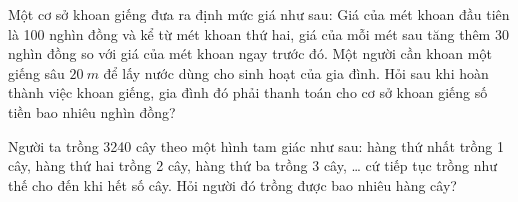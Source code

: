 \begin{ex} %
	Một cơ sở khoan giếng đưa ra định mức giá như sau: Giá của mét khoan đầu tiên là 100 nghìn đồng và kể từ mét khoan thứ hai, giá của mỗi mét sau tăng thêm 30 nghìn đồng so với giá của mét khoan ngay trước đó. Một người cần khoan một giếng sâu ${20 {~m}}$ để lấy nước dùng cho sinh hoạt của gia đình. Hỏi sau khi hoàn thành việc khoan giếng, gia đình đó phải thanh toán cho cơ sở khoan giếng số tiền bao nhiêu nghìn đồng?
\end{ex}

\begin{ex} %
	Người ta trồng 3240 cây theo một hình tam giác như sau: hàng thứ nhất trồng 1 cây, hàng thứ hai trồng 2 cây, hàng thứ ba trồng 3 cây, … cứ tiếp tục trồng như thế cho đến khi hết số cây. Hỏi người đó trồng được bao nhiêu hàng cây?
\end{ex}

